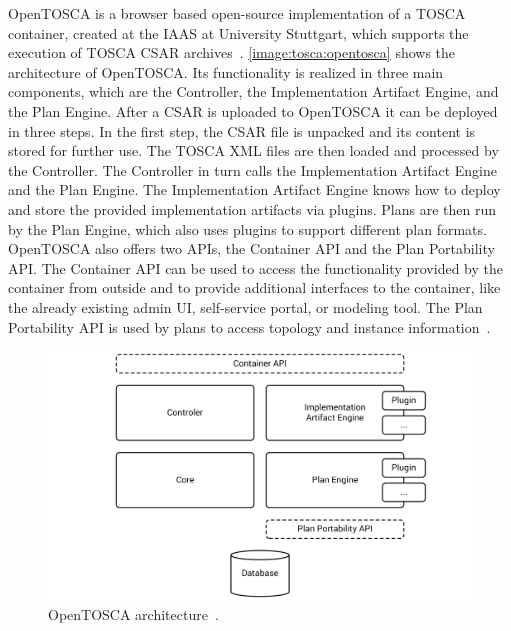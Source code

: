OpenTOSCA is a browser based open-source implementation of a TOSCA container, created at the IAAS at University Stuttgart, which supports the execution of TOSCA CSAR archives~\autocite{opentosca}.
\autoref{image:tosca:opentosca} shows the architecture of OpenTOSCA.
Its functionality is realized in three main components, which are the Controller, the Implementation Artifact Engine, and the Plan Engine.
After a CSAR is uploaded to OpenTOSCA it can be deployed in three steps.
In the first step, the CSAR file is unpacked and its content is stored for further use.
The TOSCA XML files are then loaded and processed by the Controller.
The Controller in turn calls the Implementation Artifact Engine and the Plan Engine.
The Implementation Artifact Engine knows how to deploy and store the provided implementation artifacts via plugins.
Plans are then run by the Plan Engine, which also uses plugins to support different plan formats.
OpenTOSCA also offers two APIs, the Container API and the Plan Portability API.
The Container API can be used to access the functionality provided by the container from outside and to provide additional interfaces to the container, like the already existing admin UI, self-service portal, or modeling tool.
The Plan Portability API is used by plans to access topology and instance information~\autocite{opentosca}.

\begin{figure}[!htbp]
	\centering
	\includegraphics[resolution=600]{fundamentals/assets/opentosca}
	\caption{OpenTOSCA architecture~\autocite[based on][]{opentosca}.}
	\label{image:tosca:opentosca}
\end{figure}
